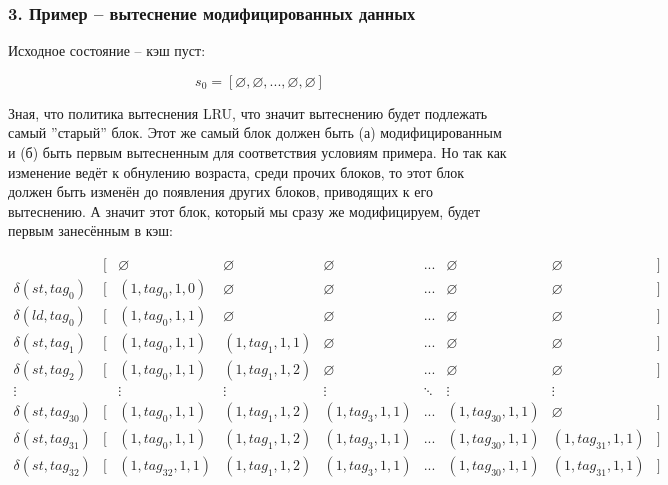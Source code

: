 
\subsubsection*{3. Пример -- вытеснение модифицированных данных}

Исходное состояние -- кэш пуст:

$$s_0 = [\varnothing,\varnothing,...,\varnothing,\varnothing]$$

Зная, что политика вытеснения LRU, что значит вытеснению будет подлежать самый ''старый'' блок. Этот же самый блок должен быть (а) модифицированным и (б) быть первым вытесненным для соответствия условиям примера. Но так как изменение ведёт к обнулению возраста, среди прочих блоков, то этот блок должен быть изменён до появления других блоков, приводящих к его вытеснению. А значит этот блок, который мы сразу же модифицируем, будет первым занесённым в кэш:

\[
\begin{matrix}
	 &[&\varnothing &\varnothing &\varnothing &...& \varnothing &\varnothing&] \\
	\delta(st,tag_0) &[& (1,tag_0,1,0) &\varnothing &\varnothing &...& \varnothing &\varnothing&] \\
	\delta(ld,tag_0) &[& (1,tag_0,1,1) &\varnothing &\varnothing &...& \varnothing &\varnothing&] \\
	\delta(st,tag_1) &[& (1,tag_0,1,1) &(1,tag_1,1,1) &\varnothing &...& \varnothing &\varnothing&] \\
	\delta(st,tag_2) &[& (1,tag_0,1,1) &(1,tag_1,1,2) &\varnothing &...& \varnothing &\varnothing&] \\
	\vdots & & \vdots & \vdots & \vdots & \ddots & \vdots &\vdots& \\
	\delta(st,tag_{30}) &[& (1,tag_0,1,1) &(1,tag_1,1,2) &(1,tag_3,1,1) &...& (1,tag_{30},1,1) &\varnothing&] \\
	\delta(st,tag_{31}) &[& (1,tag_0,1,1) &(1,tag_1,1,2) &(1,tag_3,1,1) &...& (1,tag_{30},1,1) &(1,tag_{31},1,1)&] \\
	\delta(st,tag_{32}) &[& (1,tag_{32},1,1) &(1,tag_1,1,2) &(1,tag_3,1,1) &...& (1,tag_{30},1,1) &(1,tag_{31},1,1)&] \\
\end{matrix}
\]